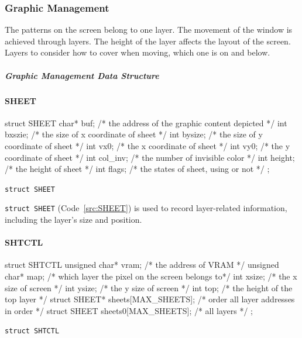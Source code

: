 \documentclass{swfcthesis}
\begin{document}
\subsubsection{Graphic Management}
\label{sec:graphic}
The patterns on the screen belong to one layer. The movement of the window is achieved
through layers. The height of the layer affects the layout of the screen. Layers to
consider how to cover when moving, which one is on and below.


  
\subparagraph{Graphic Management Data Structure}

\paragraph{SHEET}

\begin{listing}[H]
  \begin{codeblock}
\begin{ccode}
struct SHEET
{ 
  char* buf;   /* the address of the graphic content depicted */
  int bxszie;  /* the size of x coordinate of sheet */
  int bysize;  /* the size of y coordinate of sheet */
  int vx0;     /* the x coordinate of sheet */
  int vy0;     /* the y coordinate of sheet */
  int col_inv; /* the number of invisible color */
  int height;  /* the height of sheet */
  int flags;   /* the states of sheet, using or not */
};
\end{ccode}
  \end{codeblock}
  \caption{\texttt{struct SHEET}}\label{src:SHEET}  
\end{listing}

\texttt{struct SHEET} (Code~\ref{src:SHEET}) is used to record layer-related information,
including the layer's size and position.


\paragraph{SHTCTL}

\begin{listing}[H]
  \begin{codeblock}
\begin{ccode}
struct SHTCTL
{ 
  unsigned char* vram;              /* the address of VRAM */
  unsigned char* map;               /* which layer the pixel on the screen belongs to*/
  int xsize;                        /* the x size of screen */
  int ysize;                        /* the y size of screen */
  int top;                          /* the height of the top layer */
  struct SHEET* sheets[MAX_SHEETS]; /* order all layer addresses in order */
  struct SHEET sheets0[MAX_SHEETS]; /* all layers */
};
\end{ccode}
  \end{codeblock}
  \caption{\texttt{struct SHTCTL}}\label{src:SHTCTL}
\end{listing}
\end{document}

